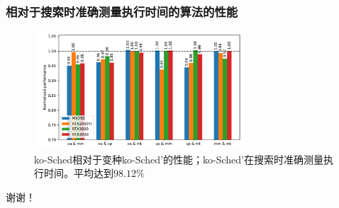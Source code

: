\documentclass[aspectratio=169]{ctexbeamer}
\begin{document}
\begin{frame}
  \frametitle{相对于搜索时准确测量执行时间的算法的性能}

  \scriptsize{\begin{center}
    \begin{figure}
      \includegraphics[width=0.7\textwidth]{figures/perf-eval-compared-to-nonsampling.pdf}
      \caption{ko-Sched相对于变种ko-Sched'的性能；ko-Sched'在搜索时准确测量执行时间。平均达到$98.12\%$}
    \end{figure}
  \end{center}}
\end{frame}

\begin{frame}
  \centerline{\Large 谢谢！}
\end{frame}
\end{document}
